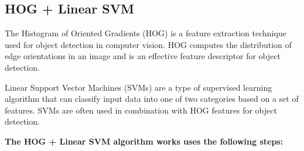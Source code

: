     \subsection{HOG + Linear SVM}
    The Histogram of Oriented Gradients (HOG) is a feature extraction technique used for object detection in computer vision. 
    HOG computes the distribution of edge orientations in an image and is an effective feature descriptor for object detection.

    Linear Support Vector Machines (SVMs) are a type of supervised learning algorithm that can classify input data into one of two categories based on a set of features. 
    SVMs are often used in combination with HOG features for object detection.
    \cite{hgms:hog-multiscale}

        \textbf{The HOG + Linear SVM algorithm works uses the following steps:}
